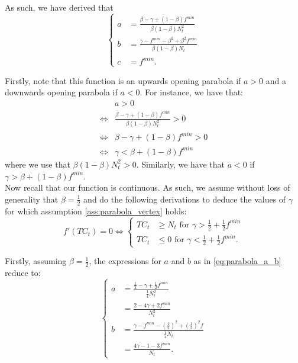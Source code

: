 \documentclass[12pt]{article}
\begin{document}
\begin{appendices}
        As such, we have derived that
        \begin{equation} \label{eq:parabola_a_b}
		    \begin{cases}
		        a &= \frac{\beta - \gamma + (1-\beta)f^{min}}{\beta(1-\beta)N_t^2} \\
		        b &= \frac{\gamma - f^{min} - \beta^2 + \beta^2 f^{min}}{\beta(1-\beta)N_t} \\
		        c &= f^{min}.
		    \end{cases}
		\end{equation}
        
        Firstly, note that this function is an upwards opening parabola if $a>0$ and a downwards opening parabola if $a<0$. For instance, we have that:
        \begin{align*}
            & a > 0 \\
            \iff & \frac{\beta - \gamma + (1-\beta)f^{min}}{\beta(1-\beta)N_t^2} > 0 \\
            \iff & \beta - \gamma + (1-\beta)f^{min} > 0 \\
            \iff & \gamma < \beta + (1-\beta)f^{min}
        \end{align*}
        where we use that $\beta(1-\beta)N_t^2 > 0$. Similarly, we have that $a < 0$ if $\gamma > \beta + (1-\beta)f^{min}$. \\
        
        Now recall that our function is continuous. As such, we assume without loss of generality that $\beta = \frac{1}{2}$ and do the following derivations to deduce the values of $\gamma$ for which assumption \ref{ass:parabola_vertex} holds:
        \begin{equation*}
            f'(TC_t) = 0 \iff 
		    \begin{cases}
		        TC_t &\geq N_t \text{ for } \gamma > \frac{1}{2} + \frac{1}{2}f^{min} \\
		        TC_t &\leq 0 \text{ for } \gamma < \frac{1}{2} + \frac{1}{2}f^{min}.
		    \end{cases}
		\end{equation*}
		
		Firstly, assuming $\beta = \frac{1}{2}$, the expressions for $a$ and $b$ as in \eqref{eq:parabola_a_b} reduce to:
		\begin{equation} \label{eq:parabola_a_b_reduced}
		    \begin{cases}
		        a &= \frac{\frac{1}{2} - \gamma + \frac{1}{2}f^{min}}{\frac{1}{4}N_t^2} \\
		        &= \frac{2 - 4\gamma + 2f^{min}}{N_t^2} \\
		        b &= \frac{\gamma - f^{min} - \left(\frac{1}{2}\right)^2 + \left(\frac{1}{2}\right)^2 f}{\frac{1}{4}N_t} \\
		        &= \frac{4\gamma - 1 - 3f^{min}}{N_t}.
		    \end{cases}
		\end{equation}
		

\end{appendices}
\end{document}
